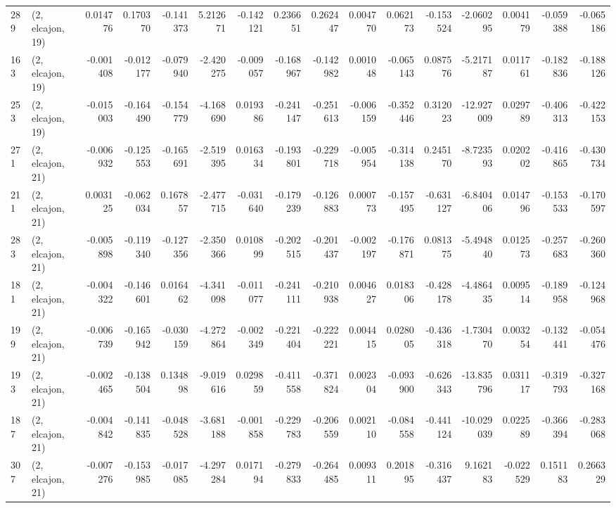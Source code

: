 \begin{tabular}{llrrrrrrrrrrrrrr}
289 &  (2, elcajon, 19) &   0.014776 &  0.170370 & -0.141373 &   5.212671 & -0.142121 &   0.236651 &  0.262447 &  0.004770 &  0.062173 & -0.153524 &    -2.060295 &   0.004179 &  -0.059388 &  -0.065186 \\
163 &  (2, elcajon, 19) &  -0.001408 & -0.012177 & -0.079940 &  -2.420275 & -0.009057 &  -0.168967 & -0.142982 &  0.001048 & -0.065143 &  0.087576 &    -5.217187 &   0.011761 &  -0.182836 &  -0.188126 \\
253 &  (2, elcajon, 19) &  -0.015003 & -0.164490 & -0.154779 &  -4.168690 &  0.019386 &  -0.241147 & -0.251613 & -0.006159 & -0.352446 &  0.312023 &   -12.927009 &   0.029789 &  -0.406313 &  -0.422153 \\
271 &  (2, elcajon, 21) &  -0.006932 & -0.125553 & -0.165691 &  -2.519395 &  0.016334 &  -0.193801 & -0.229718 & -0.005954 & -0.314138 &  0.245170 &    -8.723593 &   0.020202 &  -0.416865 &  -0.430734 \\
211 &  (2, elcajon, 21) &   0.003125 & -0.062034 &  0.167857 &  -2.477715 & -0.031640 &  -0.179239 & -0.126883 &  0.000773 & -0.157495 & -0.631127 &    -6.840406 &   0.014796 &  -0.153533 &  -0.170597 \\
283 &  (2, elcajon, 21) &  -0.005898 & -0.119340 & -0.127356 &  -2.350366 &  0.010899 &  -0.202515 & -0.201437 & -0.002197 & -0.176871 &  0.081375 &    -5.494840 &   0.012573 &  -0.257683 &  -0.260360 \\
181 &  (2, elcajon, 21) &  -0.004322 & -0.146601 &  0.016462 &  -4.341098 & -0.011077 &  -0.241111 & -0.210938 &  0.004627 &  0.018306 & -0.428178 &    -4.486435 &   0.009514 &  -0.189958 &  -0.124968 \\
199 &  (2, elcajon, 21) &  -0.006739 & -0.165942 & -0.030159 &  -4.272864 & -0.002349 &  -0.221404 & -0.222221 &  0.004415 &  0.028005 & -0.436318 &    -1.730470 &   0.003254 &  -0.132441 &  -0.054476 \\
193 &  (2, elcajon, 21) &  -0.002465 & -0.138504 &  0.134898 &  -9.019616 &  0.029859 &  -0.411558 & -0.371824 &  0.002304 & -0.093900 & -0.626343 &   -13.835796 &   0.031117 &  -0.319793 &  -0.327168 \\
187 &  (2, elcajon, 21) &  -0.004842 & -0.141835 & -0.048528 &  -3.681188 & -0.001858 &  -0.229783 & -0.206559 &  0.002110 & -0.084558 & -0.441124 &   -10.029039 &   0.022589 &  -0.366394 &  -0.283068 \\
307 &  (2, elcajon, 21) &  -0.007276 & -0.153985 & -0.017085 &  -4.297284 &  0.017194 &  -0.279833 & -0.264485 &  0.009311 &  0.201895 & -0.316437 &     9.162183 &  -0.022529 &   0.151183 &   0.266329 \\

\end{tabular}

